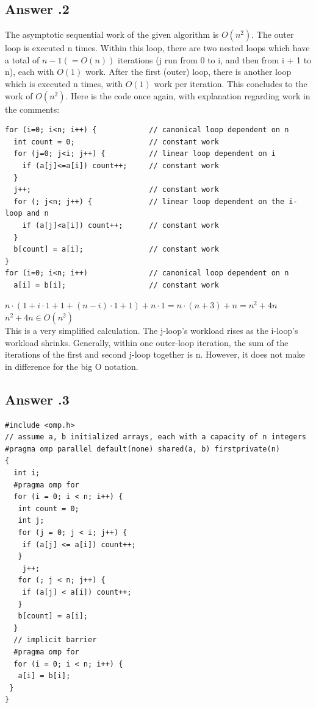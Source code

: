 \documentclass[a4paper,%
11pt,%
DIV=12,
headsepline,%
headings=normal,
]{scrartcl}
\newcounter{curex}
\newcommand{\answer}[1]{\subsection*{Answer \arabic{curex}.#1}}
\begin{document}
\answer{2}
The asymptotic sequential work of the given algorithm is $O(n^{2})$. The outer loop is executed n times. Within this loop, there are two nested loops which have a total of $n-1 (= O(n))$ iterations (j run from 0 to i, and then from i + 1 to n), each with $O(1)$ work. After the first (outer) loop, there is another loop which is executed n times, with $O(1)$ work per iteration. This concludes to the work of $O(n^{2})$. Here is the code once again, with explanation regarding work in the comments:

\begin{minipage}[t]{1.0\linewidth}
\begin{lstlisting}
for (i=0; i<n; i++) {            // canonical loop dependent on n
  int count = 0;                 // constant work
  for (j=0; j<i; j++) {          // linear loop dependent on i
    if (a[j]<=a[i]) count++;     // constant work
  }
  j++;                           // constant work
  for (; j<n; j++) {             // linear loop dependent on the i-loop and n
    if (a[j]<a[i]) count++;      // constant work
  }
  b[count] = a[i];               // constant work
}
for (i=0; i<n; i++)              // canonical loop dependent on n
  a[i] = b[i];                   // constant work
\end{lstlisting}
\end{minipage}
\noindent
\begin{math}n \cdot (1 + i \cdot 1 + 1 + (n-i) \cdot 1 + 1) + n \cdot 1 = n \cdot (n + 3) + n = n^2 + 4n\end{math}\\
\begin{math}n^2 + 4n \in O(n^2)\end{math}\\
This is a very simplified calculation. The j-loop's workload rises as the i-loop's workload shrinks. Generally, within one outer-loop iteration, the sum of the iterations of the first and second j-loop together is n. However, it does not make in difference for the big O notation.

\answer{3}
\begin{minipage}[t]{1.0\linewidth}
\begin{lstlisting}
#include <omp.h>
// assume a, b initialized arrays, each with a capacity of n integers
#pragma omp parallel default(none) shared(a, b) firstprivate(n)
{
  int i;
  #pragma omp for
  for (i = 0; i < n; i++) {
   int count = 0;
   int j;
   for (j = 0; j < i; j++) {
    if (a[j] <= a[i]) count++;
   }
    j++;
   for (; j < n; j++) {
    if (a[j] < a[i]) count++;
   }
   b[count] = a[i];
  }
  // implicit barrier
  #pragma omp for
  for (i = 0; i < n; i++) {
   a[i] = b[i];
 }
}
\end{lstlisting}
\end{minipage}
\end{document}
